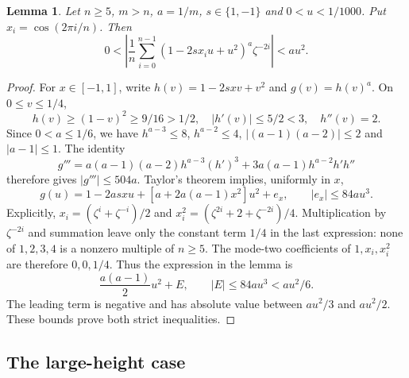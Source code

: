 \documentclass[11pt,letterpaper]{article}
\newtheorem{lemma}[theorem]{Lemma}
\theoremstyle{remark}\newtheorem{remark}[theorem]{Remark}
\begin{document}
\begin{lemma}\label{lem:taylor}
Let $n\ge5$, $m>n$, $a=1/m$, $s\in\{1,-1\}$ and $0<u<1/1000$.
Put $x_i=\cos(2\pi i/n)$. Then
\[
 0<\left|\frac1n\sum_{i=0}^{n-1}
             (1-2sx_i u+u^2)^a\zeta^{-2i}\right|<a u^2.
\]
\end{lemma}
\begin{proof}
For $x\in[-1,1]$, write $h(v)=1-2sxv+v^2$ and $g(v)=h(v)^a$.
On $0\le v\le1/4$,
\[
 h(v)\ge(1-v)^2\ge9/16>1/2,
 \quad |h'(v)|\le5/2<3,\quad h''(v)=2.
\]
Since $0<a\le1/6$, we have $h^{a-3}\le8$, $h^{a-2}\le4$,
$|(a-1)(a-2)|\le2$ and $|a-1|\le1$. The identity
\[
 g'''=a(a-1)(a-2)h^{a-3}(h')^3
                         +3a(a-1)h^{a-2}h'h''
\]
therefore gives $|g'''|\le504a$. Taylor's theorem implies, uniformly in $x$,
\[
 g(u)=1-2asxu+[a+2a(a-1)x^2]u^2+e_x,
                      \qquad |e_x|\le84a u^3.
\]
Explicitly, $x_i=(\zeta^i+\zeta^{-i})/2$ and
$x_i^2=(\zeta^{2i}+2+\zeta^{-2i})/4$. Multiplication by $\zeta^{-2i}$
and summation leave only the constant term $1/4$ in the last expression:
none of $1,2,3,4$ is a nonzero multiple of $n\ge5$. The mode-two
coefficients of $1,x_i,x_i^2$ are therefore $0,0,1/4$. Thus the expression in the lemma
is
\[
               \frac{a(a-1)}2u^2+E,\qquad |E|\le84a u^3<a u^2/6.
\]
The leading term is negative and has absolute value between $a u^2/3$
and $a u^2/2$. These bounds prove both strict inequalities.
\end{proof}

\subsection{The large-height case}
\end{document}

